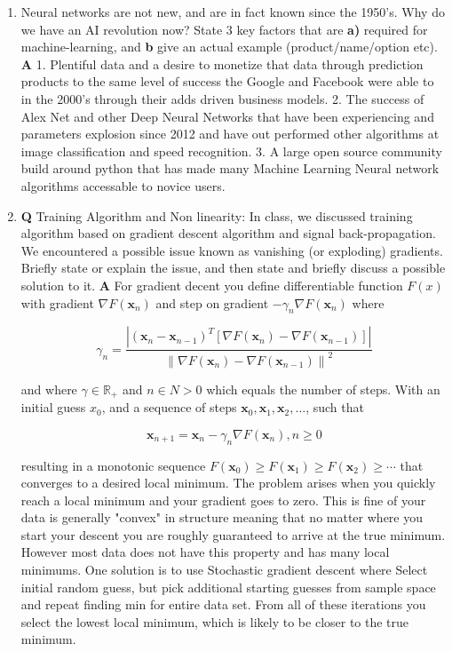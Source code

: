 \documentclass[main.tex]{subfiles}
\begin{document}
\begin{enumerate}
\item Neural networks are not new, and are in fact known since the 1950's. Why do we have an AI revolution now? State 3 key factors that are \textbf{a)} required for machine-learning, and \textbf{b} give an actual example (product/name/option etc). \textbf{A} 1. Plentiful data and a desire to monetize that data through prediction products to the same level of success the Google and Facebook were able to in the 2000's through their adds driven business models. 2. The success of Alex Net and other Deep Neural Networks that have been experiencing and parameters explosion since 2012 and have out performed other algorithms at image classification and speed recognition. 3. A large open source community build around python that has made many Machine Learning Neural network algorithms accessable to novice users. 

\item \textbf{Q} Training Algorithm and Non linearity: In class, we discussed training algorithm based on gradient descent algorithm and signal back-propagation. We encountered a possible issue known as vanishing (or exploding) gradients. Briefly state or explain the issue, and then state and briefly discuss a possible solution to it. \textbf{A} For gradient decent you define differentiable function $F(x)$ with gradient $\nabla F\left(\mathbf{x}_{n}\right)$ and step on gradient $-\gamma_{n} \nabla F\left(\mathbf{x}_{n}\right)$ where

$$\gamma_{n}=\frac{\left|\left(\mathbf{x}_{n}-\mathbf{x}_{n-1}\right)^{T}\left[\nabla F\left(\mathbf{x}_{n}\right)-\nabla F\left(\mathbf{x}_{n-1}\right)\right]\right|}{\left\|\nabla F\left(\mathbf{x}_{n}\right)-\nabla F\left(\mathbf{x}_{n-1}\right)\right\|^{2}}$$

and where $\gamma \in \mathbb{R}_{+}$ and $n \in N>0$ which equals the number of steps. With an initial guess $x_0$, and a sequence of steps $\mathbf{x}_{0}, \mathbf{x}_{1}, \mathbf{x}_{2}, \ldots$, such that 

$$\mathbf{x}_{n+1}=\mathbf{x}_{n}-\gamma_{n} \nabla F\left(\mathbf{x}_{n}\right), n \geq 0$$

resulting in a monotonic sequence $F\left(\mathbf{x}_{0}\right) \geq F\left(\mathbf{x}_{1}\right) \geq F\left(\mathbf{x}_{2}\right) \geq \cdots$ that converges to a desired local minimum. The problem arises when you quickly reach a local minimum and your gradient goes to zero. This is fine of your data is generally "convex" in structure meaning that no matter where you start your descent you are roughly guaranteed to arrive at the true minimum. However most data does not have this property and has many local minimums. One solution is to use Stochastic gradient descent where Select initial random guess, but pick additional starting guesses from sample space and repeat finding min for entire data set. From all of these iterations you select the lowest local minimum, which is likely to be closer to the true minimum.

\end{enumerate}
\end{document}
